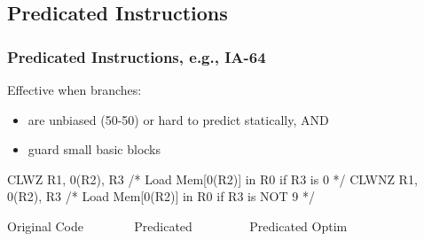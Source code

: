 \documentclass{beamer}
\renewcommand{\emph}[1]{\textcolor{structure}{#1}}
\newcommand{\emp}[1]{\textcolor{DikuRed}{ #1}}
\begin{document}
\subsection{Predicated Instructions}

\begin{frame}[fragile,t]
    \frametitle{Predicated Instructions, e.g., IA-64}

Effective when branches:
\begin{itemize}
    \item are unbiased (50-50) or hard to predict statically, AND
    \item guard small basic blocks
\end  {itemize}

\begin{colorcode}[fontsize=\scriptsize]
    CLWZ  R1, 0(R2), R3   /* Load Mem[0(R2)] in R0 if R3 is     0 */
    CLWNZ R1, 0(R2), R3   /* Load Mem[0(R2)] in R0 if R3 is NOT 9 */
\end{colorcode}


\begin{block}{Original Code{\tt~~~~~~~~}Predicated{\tt~~~~~~~~~}Predicated Optim}\vspace{-1ex}
\begin{columns}
\end{columns}
\end{block}

\bigskip


\end{frame}
\end{document}
